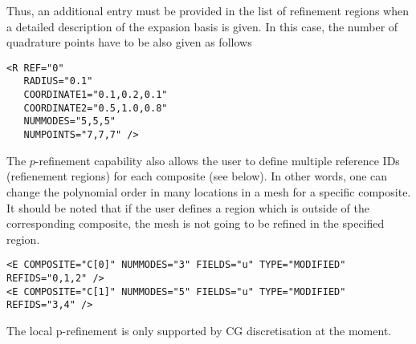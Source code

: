 Thus, an additional entry must be provided in the list of refinement regions when a detailed description of the expasion basis is given. In this case, the number of quadrature points have to be also given as follows 
\begin{lstlisting}[style=XMLStyle]
<R REF="0" 
   RADIUS="0.1" 
   COORDINATE1="0.1,0.2,0.1" 
   COORDINATE2="0.5,1.0,0.8"  
   NUMMODES="5,5,5"  
   NUMPOINTS="7,7,7" />
\end{lstlisting}

The $p$-refinement capability also allows the user to define multiple reference IDs (refienement regions) for each composite (see below). In other words, one can change the polynomial order in many locations in a mesh for a specific composite. It should be noted that if the user defines a region which is outside of the corresponding composite, the mesh is not going to be refined in the specified region. 
\begin{lstlisting}[style=XMLStyle]
<E COMPOSITE="C[0]" NUMMODES="3" FIELDS="u" TYPE="MODIFIED" REFIDS="0,1,2" />
<E COMPOSITE="C[1]" NUMMODES="5" FIELDS="u" TYPE="MODIFIED" REFIDS="3,4" />
\end{lstlisting}

The local p-refinement is only supported by CG discretisation at the moment.
